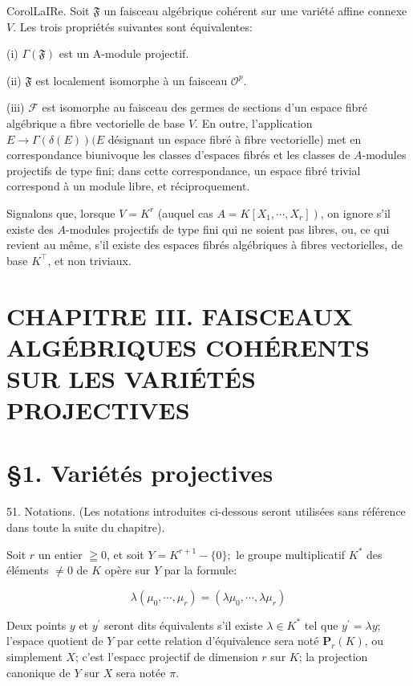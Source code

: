 CorolLaIRe. Soit $\mathfrak{F}$ un faisceau algébrique cohérent sur une variété affine connexe $V$. Les trois propriétés suivantes sont équivalentes:

(i) $\Gamma(\mathfrak{F})$ est un A-module projectif.

(ii) $\mathfrak{F}$ est localement isomorphe à un faisceau $\mathcal{O}^{p}$.

(iii) $\mathcal{F}$ est isomorphe au faisceau des germes de sections d'un espace fibré algébrique a fibre vectorielle de base $V$. En outre, l'application $E \rightarrow \Gamma(\delta(E))(E$ désignant un espace fibré à fibre vectorielle) met en correspondance biunivoque les classes d'espaces fibrés et les classes de $A$-modules projectifs de type fini; dans cette correspondance, un espace fibré trivial correspond à un module libre, et réciproquement.

Signalons que, lorsque $V=K^{r}$ (auquel cas $\left.A=K\left[X_{1}, \cdots, X_{r}\right]\right)$, on ignore s'il existe des $A$-modules projectifs de type fini qui ne soient pas libres, ou, ce qui revient au même, s'il existe des espaces fibrés algébriques à fibres vectorielles, de base $K^{\top}$, et non triviaux.

\section{CHAPITRE III. FAISCEAUX ALGÉBRIQUES COHÉRENTS SUR LES VARIÉTÉS PROJECTIVES}

\section{§1. Variétés projectives}

51. Notations. (Les notations introduites ci-dessous seront utilisées sans référence dans toute la suite du chapitre).

Soit $r$ un entier $\geqq 0$, et soit $Y=K^{r+1}-\{0\} ;$ le groupe multiplicatif $K^{*}$ des éléments $\neq 0$ de $K$ opère sur $Y$ par la formule:

$$
\lambda\left(\mu_{0}, \cdots, \mu_{r}\right)=\left(\lambda \mu_{0}, \cdots, \lambda \mu_{r}\right)
$$

Deux points $y$ et $y^{\prime}$ seront dits équivalents s'il existe $\lambda \in K^{*}$ tel que $y^{\prime}=\lambda y$; l'espace quotient de $Y$ par cette relation d'équivalence sera noté $\mathbf{P}_{r}(K)$, ou simplement $X$; c'est l'espacc projectif de dimension $r$ sur $K$; la projection canonique de $Y$ sur $X$ sera notée $\pi$.

